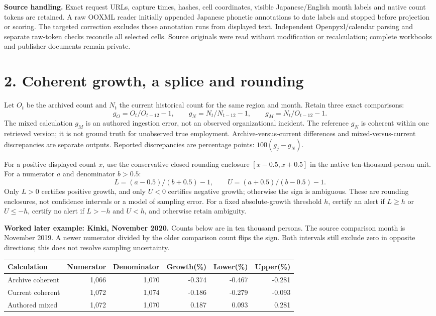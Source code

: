\documentclass[10pt,letterpaper]{article}
\begin{document}
\textbf{Source handling.} Exact request URLs, capture times, hashes, cell coordinates, visible Japanese/English month labels and native count tokens are retained. A raw OOXML reader initially appended Japanese phonetic annotations to date labels and stopped before projection or scoring. The targeted correction excludes those annotation runs from displayed text. Independent Openpyxl/calendar parsing and separate raw-token checks reconcile all selected cells. Source originals were read without modification or recalculation; complete workbooks and publisher documents remain private.
\newpage
\section*{2. Coherent growth, a splice and rounding}
Let $O_t$ be the archived count and $N_t$ the current historical count for the same region and month. Retain three exact comparisons:
\[
g_O=O_t/O_{t-12}-1,\qquad g_N=N_t/N_{t-12}-1,\qquad g_M=N_t/O_{t-12}-1.
\]
The mixed calculation $g_M$ is an authored ingestion error, not an observed organizational incident. The reference $g_N$ is coherent within one retrieved version; it is not ground truth for unobserved true employment. Archive-versus-current differences and mixed-versus-current discrepancies are separate outputs. Reported discrepancies are percentage points: $100(g_j-g_N)$.

For a positive displayed count $x$, use the conservative closed rounding enclosure $[x-0.5,x+0.5]$ in the native ten-thousand-person unit. For a numerator $a$ and denominator $b>0.5$:
\[
L=(a-0.5)/(b+0.5)-1,\qquad U=(a+0.5)/(b-0.5)-1.
\]
Only $L>0$ certifies positive growth, and only $U<0$ certifies negative growth; otherwise the sign is ambiguous. These are rounding enclosures, not confidence intervals or a model of sampling error. For a fixed absolute-growth threshold $h$, certify an alert if $L\ge h$ or $U\le-h$, certify no alert if $L>-h$ and $U<h$, and otherwise retain ambiguity.

\textbf{Worked later example: Kinki, November 2020.} Counts below are in ten thousand persons. The source comparison month is November 2019. A newer numerator divided by the older comparison count flips the sign. Both intervals still exclude zero in opposite directions; this does not resolve sampling uncertainty.
\begin{center}\small\begin{tabular}{@{}lrrrrr@{}}\toprule
Calculation & Numerator & Denominator & Growth(\%) & Lower(\%) & Upper(\%)\\\midrule
Archive coherent & 1,066 & 1,070 & -0.374 & -0.467 & -0.281 \\
Current coherent & 1,072 & 1,074 & -0.186 & -0.279 & -0.093 \\
Authored mixed & 1,072 & 1,070 & 0.187 & 0.093 & 0.281 \\
\bottomrule\end{tabular}\end{center}
\end{document}
